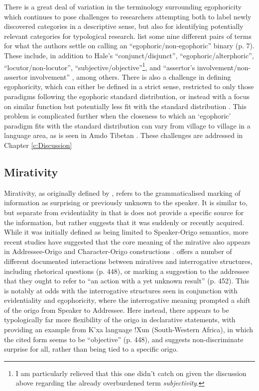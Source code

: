 There is a great deal of variation in the terminology surrounding egophoricity which continues to pose challenges to researchers attempting both to label newly discovered categories in a descriptive sense, but also for identifying potentially relevant categories for typological research.  list some nine different pairs of terms for what the authors settle on calling an ``egophoric/non-egophoric'' binary (p. 7). These include, in addition to Hale's ``conjunct/disjunct'', ``egophoric/alterphoric'', ``locutor/non-locutor'', ``subjective/objective''\footnote{I am particularly relieved that this one didn't catch on given the discussion above regarding the already overburdened term \textit{subjectivity}.}, and ``assertor's involvement/non-assertor involvement'' \cite[8]{EgoIntro}, among others. There is also a challenge in defining egophoricity, which can either be defined in a strict sense, restricted to only those paradigms following the egophoric standard distribution, or instead with a focus on similar function but potentially less fit with the standard distribution \cite{EgoIntro}. This problem is complicated further when the closeness to which an `egophoric' paradigm fits with the standard distribution can vary from village to village in a language area, as is seen in Amdo Tibetan \cite{Tribur2019}. These challenges are addressed in Chapter \ref{c:Discussion} 

\subsection{Mirativity}\label{s:Intro:MirativityIntro}
Mirativity, as originally defined by , refers to the grammaticalised marking of information as surprising or previously unknown to the speaker. It is similar to, but separate from evidentiality in that is does not provide a specific source for the information, but rather suggests that it was suddenly or recently acquired. While it was initially defined as being limited to Speaker-Origo semantics, more recent studies have suggested that the core meaning of the mirative also appears in Addressee-Origo and Character-Origo constructions \cites{HengeveldOlbertz2012}{Aikhenvald2012Mirative}.  offers a number of different documented interactions between miratives and interrogative structures, including rhetorical questions (p. 448), or marking a suggestion to the addressee that they ought to refer to ``an action with a yet unknown result'' (p. 452). This is notably at odds with the interrogative structures seen in conjunction with evidentiality and egophoricity, where the interrogative meaning prompted a shift of the origo from Speaker to Addressee. Here instead, there appears to be typologically far more flexibility of the origo in declarative statements, with  providing an example from K'xa language \mbox{!Xun} (South-Western Africa), in which the cited form seems to be ``objective'' (p. 448), and suggests non-discriminate surprise for all, rather than being tied to a specific origo.

